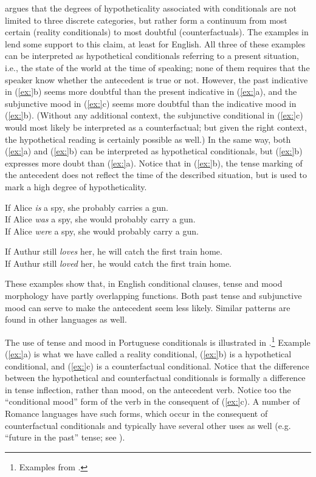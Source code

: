 \citet{Comrie1986} argues that the degrees of hypotheticality associated with conditionals are not limited to three discrete categories, but rather form a continuum from most certain (reality conditionals) to most doubtful (counterfactuals). The examples in  lend some support to this claim, at least for English. All three of these examples can be interpreted as hypothetical conditionals referring to a present situation, i.e., the state of the world at the time of speaking; none of them requires that the speaker know whether the antecedent is true or not. However, the past indicative in (\ref{ex:}b) seems more doubtful than the present indicative in (\ref{ex:}a), and the subjunctive mood in (\ref{ex:}c) seems more doubtful than the indicative mood in (\ref{ex:}b). (Without any additional context, the subjunctive conditional in (\ref{ex:}c) would most likely be interpreted as a counterfactual; but given the right context, the hypothetical reading is certainly possible as well.) In the same way, both (\ref{ex:}a) and (\ref{ex:}b) can be interpreted as hypothetical conditionals, but (\ref{ex:}b) expresses more doubt than (\ref{ex:}a). Notice that in (\ref{ex:}b), the tense marking of the antecedent does not reflect the time of the described situation, but is used to mark a high degree of hypotheticality.


\ea
\ea If Alice \textit{is} a spy, she probably carries a gun.\\
\ex If Alice \textit{was} a spy, she would probably carry a gun.\\
\ex If Alice \textit{were} a spy, she would probably carry a gun.
                       \z
\z

\ea
\ea If Authur still \textit{loves} her, he will catch the first train home.\\
\ex If Authur still \textit{loved} her, he would catch the first train home.
                       \z
\z


These examples show that, in English conditional clauses, tense and mood morphology have partly overlapping functions. Both past tense and subjunctive mood can serve to make the antecedent seem less likely. Similar patterns are found in other languages as well.



The use of tense and mood in Portuguese conditionals is illustrated in .\footnote{Examples from \citet{Gomes2008}.} Example (\ref{ex:}a) is what we have called a reality conditional, (\ref{ex:}b) is a hypothetical conditional, and (\ref{ex:}c) is a counterfactual conditional. Notice that the difference between the hypothetical and counterfactual conditionals is formally a difference in tense inflection, rather than mood, on the antecedent verb. Notice too the “conditional mood” form of the verb in the consequent of (\ref{ex:}c). A number of Romance languages have such forms, which occur in the consequent of counterfactual conditionals and typically have several other uses as well (e.g. “future in the past” tense; see ).


